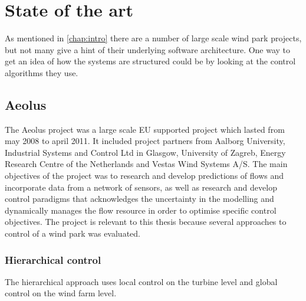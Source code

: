 \chapter{State of the art}
As mentioned in \cref{chap:intro} there are a number of large scale wind park projects, but not many give a hint of their underlying software architecture.
One way to get an idea of how the systems are structured could be by looking at the control algorithms they use.


\section{Aeolus}
The Aeolus project was a large scale EU supported project which lasted from may 2008 to april 2011. It included project partners from 
Aalborg University, Industrial Systems and Control Ltd in Glasgow, University of Zagreb, Energy Research Centre of the Netherlands and Vestas Wind Systems A/S.
The main objectives of the project was to research and develop predictions of flows and incorporate data from a network of sensors, as well as research and develop control paradigms that acknowledges the uncertainty in the modelling and dynamically manages the flow resource in order to optimise specific control objectives.
The project is relevant to this thesis because several approaches to control of a wind park was evaluated.

\subsection{Hierarchical control}
The hierarchical approach uses local control on the turbine level and global control on the wind farm level\cite{HeirarchicalWindFarmControl}.

